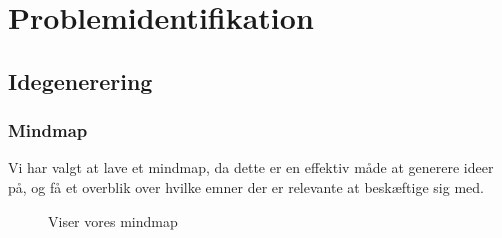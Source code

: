 \section{Problemidentifikation}\label{sec:problemidentifikation}
\subsection{Idegenerering}
\subsubsection{Mindmap}
Vi har valgt at lave et mindmap, da dette er en effektiv måde at generere ideer på, og få et overblik over hvilke emner der er relevante at beskæftige sig med.
\begin{figure}[H]
    \centering
    \caption{Viser vores mindmap}
\end{figure}

